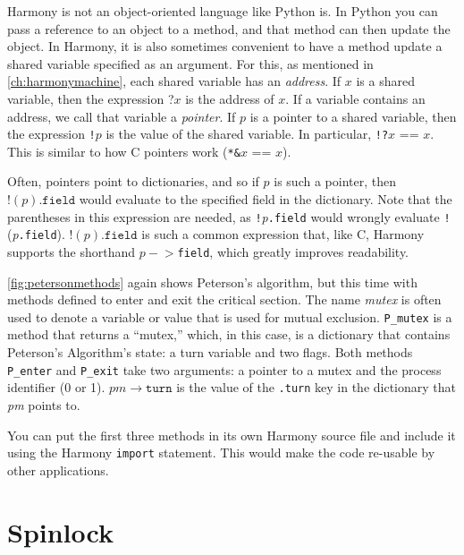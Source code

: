 \documentclass{report}
\begin{document}
Harmony is not an object-oriented language like Python is.  In Python
you can pass a reference to an object to a method, and that method
can then update the object.  In Harmony, it is also sometimes convenient
to have a method update a shared variable specified as an argument.
For this, as mentioned in \autoref{ch:harmonymachine},
each shared variable has an \emph{address}.
%
If $x$ is a shared variable, then the expression ?$x$ is the address of $x$.
If a variable contains an address, we call that variable a \emph{pointer}.
%
If $p$ is a pointer to a shared variable, then the
expression \texttt{!}$p$ is the value of the shared variable.
In particular, \texttt{!?}$x$ == $x$.
This is similar to how C pointers work (\texttt{*\string&}$x$ == $x$).

Often, pointers point to dictionaries, and so if $p$ is such a pointer,
then $!(p).\mathtt{field}$ would evaluate to the specified field in the dictionary.
Note that the parentheses in this expression
are needed, as \texttt{!}\textit{p}\texttt{.field} would wrongly evaluate
\texttt{!}(\textit{p}\texttt{.field}).
$!(p).\mathtt{field}$ is such a common expression that, like C, Harmony supports the
shorthand $p-$$>$\texttt{field}, which greatly improves readability.

\autoref{fig:petersonmethods} again shows Peterson's algorithm,
but this time with methods defined to enter and exit the critical
section.
The name \textit{mutex} is often used to denote a variable or value
that is used for mutual exclusion.
\texttt{P\_mutex} is a method that returns a ``mutex,'' which, in this
case, is a dictionary that contains Peterson's Algorithm's state:
a turn variable and two flags.
Both methods \texttt{P\_enter} and \texttt{P\_exit} take two arguments:
a pointer to a mutex and the process identifier (0 or 1).
$\mathit{pm}\rightarrow\mathtt{turn}$ is the value of the \texttt{.turn} key
in the dictionary that \textit{pm} points to. 

You can put the first three methods in its own Harmony source file
and include it using the Harmony \texttt{import} statement.
%
%
This would
make the code re-usable by other applications.

\chapter{Spinlock}
\label{ch:spinlock}
%

%
\end{document}
